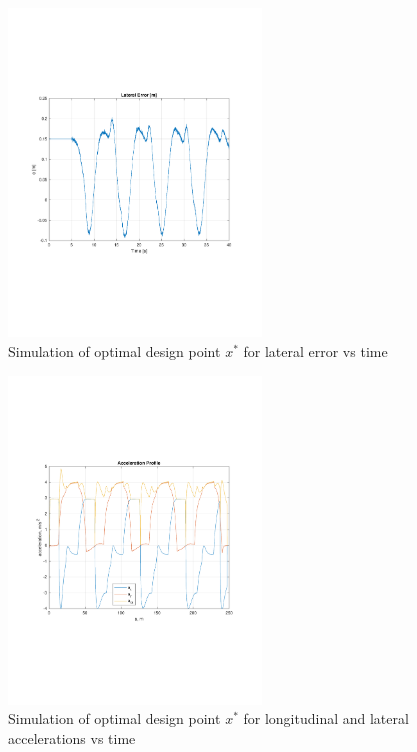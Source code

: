 \documentclass[conf]{new-aiaa}
\begin{document}
\begin{figure}[H]
    \begin{center}
        \vspace{-2.5mm}
        \includegraphics[width =0.6\textwidth]{e_Profile.pdf}
        \vspace{-7.5mm}
        \caption{Simulation of optimal design point $x^*$ for lateral error vs time}
        \label{fig:e-profile}
    \end{center}
\end{figure}

\begin{figure}[H]
    \begin{center}
        \vspace{-2.5mm}
        \includegraphics[width =0.6\textwidth]{Acceleration_Profiles.pdf}
        \vspace{-7.5mm}
        \caption{Simulation of optimal design point $x^*$ for longitudinal and lateral accelerations vs time}
        \label{fig:acc-profile}
    \end{center}
\end{figure}
\end{document}
